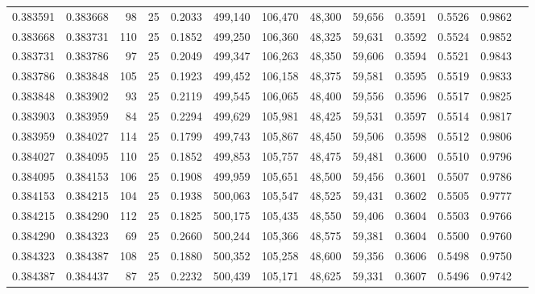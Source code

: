 \begin{tabular}{rrrrrrrrrrrrr}
0.383591 & 0.383668 &    98 &  25 &                                     0.2033 & 499,140 & 106,470 &  48,300 &  59,656 & 0.3591 & 0.5526 & 0.9862 \\
0.383668 & 0.383731 &   110 &  25 &                                     0.1852 & 499,250 & 106,360 &  48,325 &  59,631 & 0.3592 & 0.5524 & 0.9852 \\
0.383731 & 0.383786 &    97 &  25 &                                     0.2049 & 499,347 & 106,263 &  48,350 &  59,606 & 0.3594 & 0.5521 & 0.9843 \\
0.383786 & 0.383848 &   105 &  25 &                                     0.1923 & 499,452 & 106,158 &  48,375 &  59,581 & 0.3595 & 0.5519 & 0.9833 \\
0.383848 & 0.383902 &    93 &  25 &                                     0.2119 & 499,545 & 106,065 &  48,400 &  59,556 & 0.3596 & 0.5517 & 0.9825 \\
0.383903 & 0.383959 &    84 &  25 &                                     0.2294 & 499,629 & 105,981 &  48,425 &  59,531 & 0.3597 & 0.5514 & 0.9817 \\
0.383959 & 0.384027 &   114 &  25 &                                     0.1799 & 499,743 & 105,867 &  48,450 &  59,506 & 0.3598 & 0.5512 & 0.9806 \\
0.384027 & 0.384095 &   110 &  25 &                                     0.1852 & 499,853 & 105,757 &  48,475 &  59,481 & 0.3600 & 0.5510 & 0.9796 \\
0.384095 & 0.384153 &   106 &  25 &                                     0.1908 & 499,959 & 105,651 &  48,500 &  59,456 & 0.3601 & 0.5507 & 0.9786 \\
0.384153 & 0.384215 &   104 &  25 &                                     0.1938 & 500,063 & 105,547 &  48,525 &  59,431 & 0.3602 & 0.5505 & 0.9777 \\
0.384215 & 0.384290 &   112 &  25 &                                     0.1825 & 500,175 & 105,435 &  48,550 &  59,406 & 0.3604 & 0.5503 & 0.9766 \\
0.384290 & 0.384323 &    69 &  25 &                                     0.2660 & 500,244 & 105,366 &  48,575 &  59,381 & 0.3604 & 0.5500 & 0.9760 \\
0.384323 & 0.384387 &   108 &  25 &                                     0.1880 & 500,352 & 105,258 &  48,600 &  59,356 & 0.3606 & 0.5498 & 0.9750 \\
0.384387 & 0.384437 &    87 &  25 &                                     0.2232 & 500,439 & 105,171 &  48,625 &  59,331 & 0.3607 & 0.5496 & 0.9742 \\

\end{tabular}
